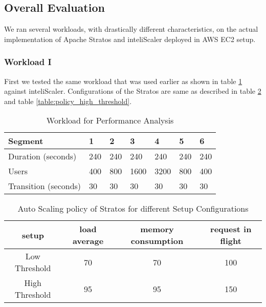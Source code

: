 \subsection{Overall Evaluation}

We ran several workloads, with drastically different characteristics, on the actual implementation of Apache Stratos and inteliScaler deployed in AWS EC2 setup.

\subsubsection{Workload I}
First we tested the same workload that was used earlier as shown in table \ref{table:analysis_workload} against inteliScaler. Configurations of the Stratos are same as described in table \ref{table:policy_low_threshold} and table \ref{table:policy_high_threshold}.

\begin{table}[h!]
\centering
\caption{Workload for Performance Analysis}
\label{table:analysis_workload}
\begin{tabular}{|l|l|l|l|l|l|l|}
\hline
Segment & 1 & 2 & 3 & 4 & 5 & 6\\ \hline
Duration (seconds) & 240 & 240 & 240 & 240 & 240 & 240 \\ \hline
Users & 400 & 800 & 1600 & 3200 & 800 & 400   \\ \hline
Transition (seconds) & 30 & 30 & 30 & 30 & 30 & 30 \\ \hline
\end{tabular}
\end{table}

\begin{table}[h!]
\centering
\caption{Auto Scaling policy of Stratos for different Setup Configurations}
\label{table:policy_low_threshold}
\begin{tabular}{|c|c|c|c|}
\hline
setup & load average & memory consumption & request in flight \\ \hline
Low Threshold & 70 & 70 & 100\\ \hline
High Threshold & 95 & 95 & 150\\ \hline
\end{tabular}
\end{table}
